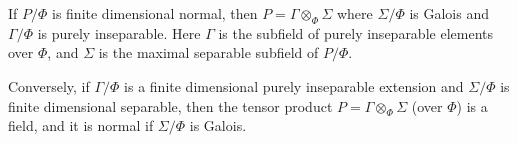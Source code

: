 If $P/\Phi$ is finite dimensional normal, then $P = \Gamma \otimes_\Phi \Sigma$ where $\Sigma/\Phi$ is Galois and $\Gamma/\Phi$ is purely inseparable. Here $\Gamma$ is the subfield of purely inseparable elements over $\Phi$, and $\Sigma$ is the maximal separable subfield of $P/\Phi$.

Conversely, if $\Gamma/\Phi$ is a finite dimensional purely inseparable extension and $\Sigma/\Phi$ is finite dimensional separable, then the tensor product $P = \Gamma \otimes_\Phi \Sigma$ (over $\Phi$) is a field, and it is normal if $\Sigma/\Phi$ is Galois.
